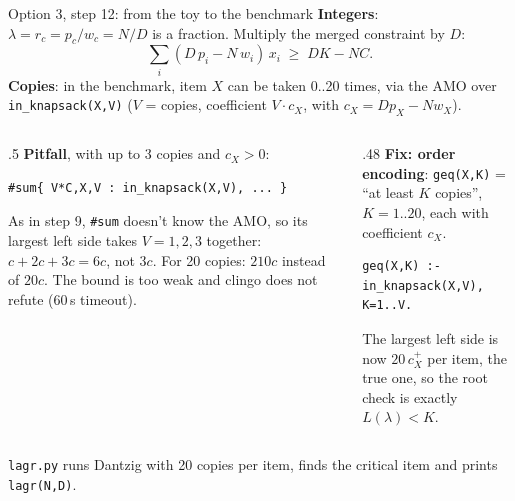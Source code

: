 \documentclass[aspectratio=169,11pt]{beamer}
\begin{document}
\begin{frame}[fragile]{Option 3, step 12: from the toy to the benchmark}
\footnotesize
\textbf{Integers}: $\lambda = r_c = p_c / w_c = N/D$ is a fraction. Multiply the merged constraint by $D$:
\[
\sum_i (D\,p_i - N\,w_i)\,x_i \;\ge\; D K - N C .
\]
\textbf{Copies}: in the benchmark, item $X$ can be taken 0..20 times, via the AMO over \texttt{in\_knapsack(X,V)} ($V$ = copies,
coefficient $V\!\cdot c_X$, with $c_X = D p_X - N w_X$).
\begin{columns}[T]
\begin{column}{.5\textwidth}
\textbf{Pitfall}, with up to 3 copies and $c_X > 0$:
\begin{lstlisting}
#sum{ V*C,X,V : in_knapsack(X,V), ... }
\end{lstlisting}
As in step 9, \texttt{\#sum} doesn't know the AMO, so its largest left side takes $V{=}1,2,3$ together: $c+2c+3c = 6c$, not $3c$.
For 20 copies: $210c$ instead of $20c$. The bound is too weak and clingo does not refute (60\,s timeout).
\end{column}
\begin{column}{.48\textwidth}
\textbf{Fix: order encoding}: \texttt{geq(X,K)} = ``at least $K$ copies'', $K = 1..20$, each with coefficient $c_X$.
\begin{lstlisting}
geq(X,K) :- in_knapsack(X,V), K=1..V.
\end{lstlisting}
The largest left side is now $20\,c_X^{+}$ per item, the true one, so the root check is exactly $L(\lambda) < K$.
\end{column}
\end{columns}
\vspace{1mm}
\texttt{lagr.py} runs Dantzig with 20 copies per item, finds the critical item and prints \texttt{lagr(N,D)}.
\end{frame}
\end{document}

